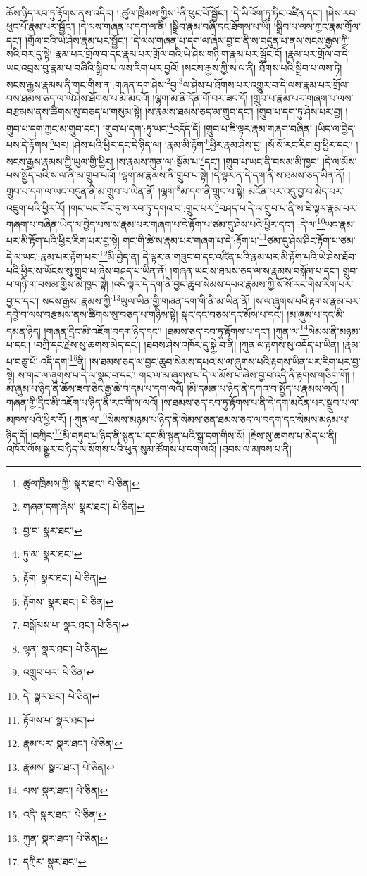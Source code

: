 ཆོས་ཉིད་རབ་ཏུ་རྟོགས་ནས་འདིར། །:ཚུལ་ཁྲིམས་ཀྱིས་\footnote{ཚུལ་ཁྲིམས་ཀྱི་  སྣར་ཐང་།  པེ་ཅིན། }ནི་ཕུང་པོ་སྦྱོང་། །དེ་ཡི་འོག་ཏུ་ཏིང་འཛིན་དང་། །ཤེས་རབ་ཕུང་པོ་རྣམ་པར་སྦྱོང་། །དེ་ལས་གཞན་པ་དག་ལ་ནི། །སྒྲིབ་རྣམ་བཞི་དང་ཐོགས་པ་ཡི། །སྒྲིབ་པ་ལས་ཀྱང་རྣམ་གྲོལ་དང་། །གྲོལ་བའི་ཡེ་ཤེས་རྣམ་པར་སྦྱོང་། །དེ་ལས་གཞན་པ་དག་ལ་ཞེས་བྱ་བ་ནི་ས་བདུན་པ་ནས་སངས་རྒྱས་ཀྱི་སའི་བར་དུ་སྟེ། རྣམ་པར་གྲོལ་བ་དང་རྣམ་པར་གྲོལ་བའི་ཡེ་ཤེས་གཉི་ག་རྣམ་པར་སྦྱོང་ངོ། །རྣམ་པར་གྲོལ་བ་དེ་ཡང་འབྲས་བུ་རྣམ་པ་བཞིའི་སྒྲིབ་པ་ལས་རིག་པར་བྱའོ། །སངས་རྒྱས་ཀྱི་ས་ལ་ནི། ཐོགས་པའི་སྒྲིབ་པ་ལས་ཏེ། སངས་རྒྱས་རྣམས་ནི་གང་གིས་ན་:གཞན་དག་ཤེས་\footnote{གཞན་དག་ཞེས་  སྣར་ཐང་།  པེ་ཅིན། }བྱ་\footnote{བྱ་བ་  སྣར་ཐང་། }ལ་ཤེས་པ་ཐོགས་པར་འགྱུར་བ་དེ་ལས་རྣམ་པར་གྲོལ་བས་ཐམས་ཅད་ལ་ཡེ་ཤེས་ཐོགས་པ་མི་མངའོ། །ལྷག་མ་ནི་དོན་གོ་བར་ཟད་དོ། །གྲུབ་པ་རྣམ་པར་གཞག་པ་ལས་བརྩམས་ནས་ཚིགས་སུ་བཅད་པ་གསུམ་སྟེ། །ས་རྣམས་ཐམས་ཅད་མ་གྲུབ་དང་། །གྲུབ་པ་དག་ཏུ་ཤེས་པར་བྱ། །
གྲུབ་པ་དག་ཀྱང་མ་གྲུབ་དང་། །གྲུབ་པ་དག་:ཏུ་ཡང་\footnote{ཏུ་མ་  སྣར་ཐང་། }འདོད་དོ། །གྲུབ་པ་ཇི་ལྟར་རྣམ་གཞག་བཞིན། །ཡིད་ལ་བྱེད་པས་དེ་རྟོགས་\footnote{རྟོག་  སྣར་ཐང་།  པེ་ཅིན། }པར། །ཤེས་པའི་ཕྱིར་དང་དེ་ཉིད་ལ། །རྣམ་མི་རྟོག་\footnote{རྟོགས་  སྣར་ཐང་།  པེ་ཅིན། }ཕྱིར་རྣམ་ཤེས་བྱ། །སོ་སོ་རང་རིག་བྱ་ཕྱིར་དང་། །སངས་རྒྱས་རྣམས་ཀྱི་ཡུལ་གྱི་ཕྱིར། །ས་རྣམས་ཀུན་ལ་:སྒོམ་པ་\footnote{བསྒོམས་པ་  སྣར་ཐང་།  པེ་ཅིན། }དང་། །གྲུབ་པ་ཡང་ནི་བསམ་མི་ཁྱབ། །དེ་ལ་མོས་པས་སྤྱོད་པའི་ས་ལ་ནི་མ་གྲུབ་པའོ། །ལྷག་མ་རྣམས་ནི་གྲུབ་པ་སྟེ། །དེ་ལྟར་ན་དེ་དག་ནི་ས་ཐམས་ཅད་ཡིན་ནོ། །གྲུབ་པ་དག་ལ་ཡང་བདུན་ནི་མ་གྲུབ་པ་ཡིན་ནོ། །ལྷག་\footnote{ལྷན་  སྣར་ཐང་།  པེ་ཅིན། }མ་དག་ནི་གྲུབ་པ་སྟེ། མངོན་པར་འདུ་བྱ་བ་མེད་པར་འཇུག་པའི་ཕྱིར་རོ། །གང་ཡང་གོང་དུ་ས་རབ་ཏུ་དགའ་བ་:གྲུང་པར་\footnote{འགྲུབ་པར་  པེ་ཅིན། }བཤད་པ་དེ་ལ་གྲུབ་པ་ནི་ས་ཇི་ལྟར་རྣམ་པར་གཞག་པ་བཞིན་ཡིད་ལ་བྱེད་པས་ས་རྣམ་པར་གཞག་པ་དེ་རྟོག་པ་ཙམ་དུ་ཤེས་པའི་ཕྱིར་དང་། :དེ་ལ་\footnote{དེ་  སྣར་ཐང་།  པེ་ཅིན། }ཡང་རྣམ་པར་མི་རྟོག་པའི་ཕྱིར་རིག་པར་བྱ་སྟེ། གང་གི་ཚེ་ས་རྣམ་པར་གཞག་པ་དེ་:རྟོག་པ་\footnote{རྟོགས་པ་  སྣར་ཐང་། }ཙམ་དུ་ཤེས་ཤིང་རྟོག་པ་ཙམ་དེ་ལ་ཡང་:རྣམ་པར་རྟོག་པར་\footnote{རྣམ་པར་  སྣར་ཐང་།  པེ་ཅིན། }མི་བྱེད་ན། དེ་ལྟར་ན་གཟུང་བ་དང་འཛིན་པའི་རྣམ་པར་མི་རྟོག་པའི་ཡེ་ཤེས་ཐོབ་པའི་ཕྱིར་ས་ཡོངས་སུ་གྲུབ་པ་ཞེས་བཤད་པ་ཡིན་ནོ། །གཞན་ཡང་ས་ཐམས་ཅད་ལ་ས་རྣམས་བསྒོམ་པ་དང་། གྲུབ་པ་གཉི་ག་བསམ་གྱིས་མི་ཁྱབ་སྟེ། །འདི་ལྟར་དེ་དག་ནི་བྱང་ཆུབ་སེམས་དཔའ་རྣམས་ཀྱི་སོ་སོ་རང་གིས་རིག་པར་བྱ་བ་དང་། སངས་རྒྱས་:རྣམས་ཀྱི་\footnote{རྣམས་  སྣར་ཐང་།  པེ་ཅིན། }ཡུལ་ཡིན་གྱི་གཞན་དག་གི་ནི་མ་ཡིན་ནོ། །ས་ལ་ཞུགས་པའི་རྟགས་རྣམ་པར་དབྱེ་བ་ལས་བརྩམས་ནས་ཚིགས་སུ་བཅད་པ་གཉིས་སྟེ། སྣང་དང་བཅས་དང་མོས་པ་དང་། །མ་ཞུམ་པ་དང་མི་དམན་ཉིད། །གཞན་དྲིང་མི་འཇོག་བདག་ཉིད་དང་། །ཐམས་ཅད་རབ་ཏུ་རྟོགས་པ་དང་། །ཀུན་ལ་\footnote{ལས་  སྣར་ཐང་།  པེ་ཅིན། }སེམས་ནི་མཉམ་པ་དང་། །བཀྲི་དང་རྗེས་སུ་ཆགས་མེད་དང་། །ཐབས་ཤེས་འཁོར་དུ་སྐྱེ་བ་ནི། །ཀུན་ལ་རྟགས་སུ་འདོད་པ་ཡིན། །རྣམ་པ་བཅུ་པོ་:འདི་དག་\footnote{འདི་  སྣར་ཐང་།  པེ་ཅིན། }ནི། །ས་ཐམས་ཅད་ལ་བྱང་ཆུབ་སེམས་དཔའ་ས་ལ་ཞུགས་པའི་རྟགས་ཡིན་པར་རིག་པར་བྱ་སྟེ། ས་གང་ལ་ཞུགས་པ་དེ་ལ་སྣང་བ་དང་། གང་ལ་མ་ཞུགས་པ་དེ་ལ་མོས་པ་ཞེས་བྱ་བ་འདི་ནི་རྟགས་གཅིག་གོ། །མ་ཞུམ་པ་ཉིད་ནི་ཆོས་ཟབ་ཅིང་རྒྱ་ཆེ་བ་དམ་པ་དག་ལའོ། །མི་དམན་པ་ཉིད་ནི་དཀའ་བ་སྤྱོད་པ་རྣམས་ལའོ། །གཞན་གྱི་དྲིང་མི་འཇོག་པ་ཉིད་ནི་རང་གི་ས་ལའོ། །ས་ཐམས་ཅད་རབ་ཏུ་རྟོགས་པ་ནི་དེ་དག་མངོན་པར་སྒྲུབ་པ་ལ་མཁས་པའི་ཕྱིར་རོ། །:ཀུན་ལ་\footnote{ཀུན་  སྣར་ཐང་།  པེ་ཅིན། }སེམས་མཉམ་པ་ཉིད་ནི་སེམས་ཅན་ཐམས་ཅད་ལ་བདག་དང་སེམས་མཉམ་པ་ཉིད་དོ། །བཀྲིར་\footnote{དཀྲིར་  སྣར་ཐང་། }མི་བཏུབ་པ་ཉིད་ནི་སྙན་པ་དང་མི་སྙན་པའི་སྒྲ་དག་གིས་སོ། །རྗེས་སུ་ཆགས་པ་མེད་པ་ནི། འཁོར་ལོས་སྒྱུར་བ་ཉིད་ལ་སོགས་པའི་ཕུན་སུམ་ཚོགས་པ་དག་ལའོ། །ཐབས་ལ་མཁས་པ་ནི། 